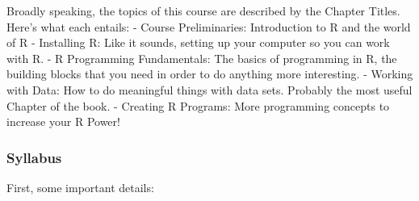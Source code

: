 \documentclass[
]{article}
\begin{document}
Broadly speaking, the topics of this course are described by the Chapter Titles. Here's what each entails:
- Course Preliminaries: Introduction to R and the world of R
- Installing R: Like it sounds, setting up your computer so you can work with R.
- R Programming Fundamentals: The basics of programming in R, the building blocks that you need in order to do anything more interesting.
- Working with Data: How to do meaningful things with data sets. Probably the most useful Chapter of the book.
- Creating R Programs: More programming concepts to increase your R Power!

\hypertarget{syllabus}{%
\subsubsection{Syllabus}\label{syllabus}}

First, some important details:
\end{document}
